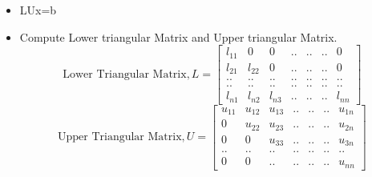 \documentclass[12pt]{beamer}
\begin{document}
		
\begin{frame}
\begin{itemize}
\item LUx=b
\item Compute Lower triangular Matrix and Upper triangular Matrix.\\
\[
\textrm{Lower Triangular Matrix}, L=
\begin{bmatrix}
l_{11} & 0 & 0 & .. & .. & .. & 0\\
l_{21} & l_{22} & 0 & ..& ..& .. & 0\\
.. & .. & .. & .. & .. & .. & ..\\
.. & .. & .. & .. & .. & .. & ..\\
l_{n1} & l_{n2} & l_{n3} & .. & .. & .. & l_{nn}
	
\end{bmatrix}
\]  
\[
\textrm{Upper Triangular Matrix},  U=
\begin{bmatrix}
	u_{11} & u_{12} & u_{13} & .. & .. & .. & u_{1n}\\
	0 & u_{22} & u_{23} & .. & .. & .. & u_{2n}\\
	0 & 0 & u_{33} & .. & ..& .. & u_{3n}\\
	.. & .. & .. & .. & .. & .. & ..\\
	0 & 0 & .. & .. & .. & ..& u_{nn}
\end{bmatrix}
\]
\end{itemize}
\end{frame}
\end{document}
